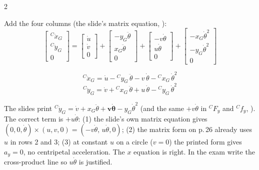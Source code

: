 \begin{multicols}{2}
\begin{deriv}
Add the four columns (the slide's matrix equation, ):
\[\begin{bmatrix}{}^C\ddot x_G\\{}^C\ddot y_G\\0\end{bmatrix}=\begin{bmatrix}\dot u\\\dot v\\0\end{bmatrix}+\begin{bmatrix}-y_G\ddot\theta\\x_G\ddot\theta\\0\end{bmatrix}+\begin{bmatrix}-v\dot\theta\\u\dot\theta\\0\end{bmatrix}+\begin{bmatrix}-x_G\dot\theta^2\\-y_G\dot\theta^2\\0\end{bmatrix}\]
\end{deriv}
\begin{fbx}[Components \pg{24}]
\[{}^C\ddot x_G=\dot u-{}^Cy_G\,\ddot\theta-v\,\dot\theta-{}^Cx_G\,\dot\theta^2\]
\[{}^C\ddot y_G=\dot v+{}^Cx_G\,\ddot\theta+\boxed{u}\,\dot\theta-{}^Cy_G\,\dot\theta^2\]
\end{fbx}
\begin{slideerr}
The slides print ${}^C\ddot y_G=\dot v+x_G\ddot\theta+\mathbf{v\dot\theta}-y_G\dot\theta^2$ (and the same $+v\dot\theta$ in ${}^CF_y$ and ${}^Cf_y$, ). The correct term is $+u\dot\theta$: (1) the slide's own matrix equation gives $(0,0,\dot\theta)\times(u,v,0)=(-v\dot\theta,\,u\dot\theta,0)$; (2) the matrix form on p.\,26 already uses $u$ in rows 2 and 3; (3) at constant $u$ on a circle ($v=0$) the printed form gives $a_y=0$, no centripetal acceleration. The $x$ equation is right. In the exam write the cross-product line so $u\dot\theta$ is justified. \chk
\end{slideerr}

\end{multicols}
